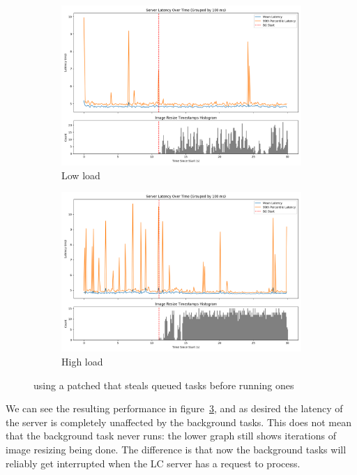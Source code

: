 \begin{figure}[t]
    \centering
    \begin{subfigure}[t]{0.48\textwidth}
        \includegraphics[width=\textwidth]{graphs/patched-idle-low-two.png}
        \caption{Low load}\label{fig:patched-idle-low-two}
    \end{subfigure}
    \hspace{\fill}
    \begin{subfigure}[t]{0.48\textwidth}
        \includegraphics[width=\textwidth]{graphs/patched-idle-high-two.png}
        \caption{High load}\label{fig:patched-idle-high-two}
    \end{subfigure}
    \caption{using a patched \schedidle{} that steals queued \schednormal{}
    tasks before running \schedidle{} ones}\label{fig:patched-idle}
\end{figure}

We can see the resulting performance in figure~\ref{fig:patched-idle}, and as
desired the latency of the server is completely unaffected by the background
tasks. This does not mean that the background task never runs: the lower graph
still shows iterations of image resizing being done. The difference is that now
the background tasks will reliably get interrupted when the LC server has a
request to process.

